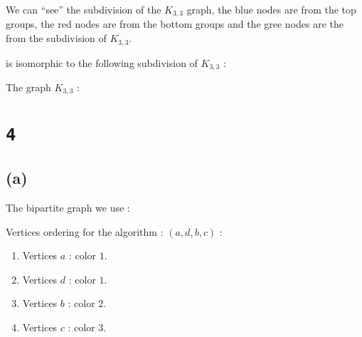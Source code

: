 \documentclass[a4paper,11pt]{report}
\begin{document}
We can ``see'' the subdivision of the $K_{3,3}$ graph, the blue nodes are from
the top groups, the red nodes are from the bottom groups and the gree nodes are
the from the subdivision of $K_{3,3}$.

\begin{center}
\end{center}

is isomorphic to the following subdivision of $K_{3,3}$ :

The graph $K_{3,3}$ :

\begin{center}
\end{center}

\section*{\texttt{4}}

\subsection*{(a)}

The bipartite graph we use :

\begin{center}
\end{center}

Vertices ordering for the algorithm : $(a,d,b,c)$ :

\begin{enumerate}
\item Vertices $a$ : color $1$.
\item Vertices $d$ : color $1$.
\item Vertices $b$ : color $2$.
\item Vertices $c$ : color $3$.
\end{enumerate}
\end{document}

